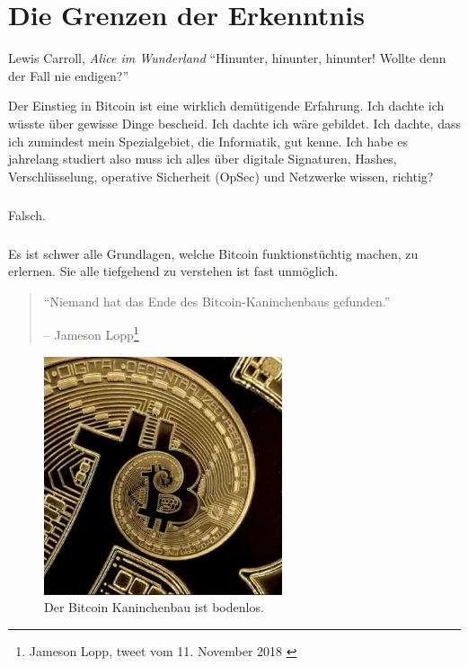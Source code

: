 \chapter{Die Grenzen der Erkenntnis}
\label{les:7}

\begin{chapquote}{Lewis Carroll, \textit{Alice im Wunderland}}
\enquote{Hinunter, hinunter, hinunter! Wollte denn der Fall nie endigen?}
\end{chapquote}

Der Einstieg in Bitcoin ist eine wirklich demütigende Erfahrung. Ich dachte ich
wüsste über gewisse Dinge bescheid. Ich dachte ich wäre gebildet. Ich dachte,
dass ich zumindest mein Spezialgebiet, die Informatik, gut kenne. Ich habe es
jahrelang studiert also muss ich alles über digitale Signaturen, Hashes,
Verschlüsselung, operative Sicherheit (OpSec) und Netzwerke wissen, richtig?

\paragraph{}
Falsch.

\paragraph{}
Es ist schwer alle Grundlagen, welche Bitcoin funktionstüchtig machen, zu
erlernen. Sie alle tiefgehend zu verstehen ist fast unmöglich.

\begin{quotation}\begin{samepage}
\enquote{Niemand hat das Ende des Bitcoin-Kaninchenbaus gefunden.}
\begin{flushright} -- Jameson Lopp\footnote{Jameson Lopp, tweet vom 11. November 2018 \cite{lopp-tweet}}
\end{flushright}\end{samepage}\end{quotation}

\begin{figure}
  \centering
  \includegraphics[width=7cm]{assets/images/rabbit-hole-bottomless.png}
  \caption{Der Bitcoin Kaninchenbau ist bodenlos.}
  \label{fig:rabbit-hole-bottomless}
\end{figure}

